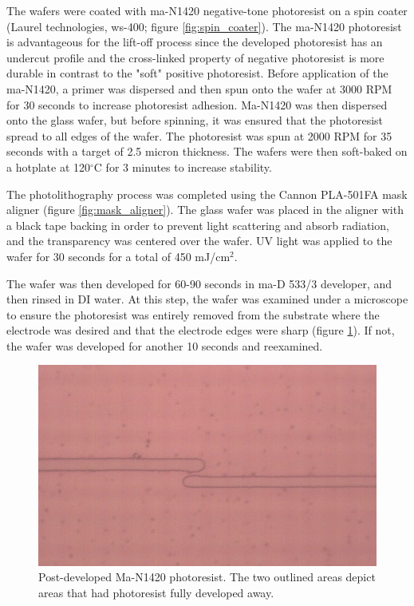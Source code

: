 \par The wafers were coated with ma-N1420 negative-tone photoresist on a spin coater (Laurel technologies, ws-400; figure \ref{fig:spin_coater}). The ma-N1420 photoresist is advantageous for the lift-off process since the developed photoresist has an undercut profile and the cross-linked property of negative photoresist is more durable in contrast to the "soft" positive photoresist. Before application of the ma-N1420, a primer was dispersed and then spun onto the wafer at 3000 RPM for 30 seconds to increase photoresist adhesion. Ma-N1420 was then dispersed onto the glass wafer, but before spinning, it was ensured that the photoresist spread to all edges of the wafer. The photoresist was spun at 2000 RPM for 35 seconds with a target of 2.5 micron thickness. The wafers were then soft-baked on a hotplate at 120$^\circ$C for 3 minutes to increase stability. 

\par The photolithography process was completed using the Cannon PLA-501FA mask aligner (figure \ref{fig:mask_aligner}). The glass wafer was placed in the aligner with a black tape backing in order to prevent light scattering and absorb radiation, and the transparency was centered over the wafer. UV light was applied to the wafer for 30 seconds for a total of 450 mJ/cm$^2$. 

\par The wafer was then developed for 60-90 seconds in  ma-D 533/3 developer, and then rinsed in DI water. At this step, the wafer was examined under a microscope to ensure the photoresist was entirely removed from the substrate where the electrode was desired and that the electrode edges were sharp (figure \ref{fig:photoresist_microscope}). If not, the wafer was developed for another 10 seconds and reexamined. 

\begin{figure}[h]
    \centering
    \includegraphics[width=\textwidth]{images/microscope_photoresist.png}
    \caption[Post-developed Ma-N1420 photoresist]{Post-developed Ma-N1420 photoresist. The two outlined areas depict areas that had photoresist fully developed away.}
    \label{fig:photoresist_microscope}
\end{figure}

